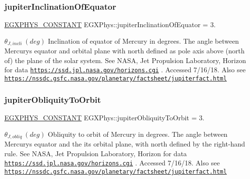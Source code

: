 \subsubsection{\texorpdfstring{jupiter\+Inclination\+Of\+Equator}{jupiterInclinationOfEquator}}
{\footnotesize\ttfamily \mbox{\hyperlink{group___e_g_x_phys-_constants-_macros_ga76980d288494ce1714c9ac68a95ba702}{E\+G\+X\+P\+H\+Y\+S\+\_\+\+C\+O\+N\+S\+T\+A\+NT}} E\+G\+X\+Phys\+::jupiter\+Inclination\+Of\+Equator = 3.}

$ \theta_{J,incli} \ (deg)$ Inclination of equator of Mercury in degrees. The angle between Mercury\textquotesingle{}s equator and orbital plane with north defined as pole axis above (north of) the plane of the solar system. See N\+A\+SA, Jet Propulsion Laboratory, Horizon for data \href{https://ssd.jpl.nasa.gov/horizons.cgi}{\tt https\+://ssd.\+jpl.\+nasa.\+gov/horizons.\+cgi} . Accessed 7/16/18. Also see \href{https://nssdc.gsfc.nasa.gov/planetary/factsheet/jupiterfact.html}{\tt https\+://nssdc.\+gsfc.\+nasa.\+gov/planetary/factsheet/jupiterfact.\+html} \mbox{\label{group___e_g_x_phys-_constants-_astrophysics-_solar_system-_mercury-_orbit_ga80cd2231e9fa0fb10ecf5ea62fdc0ddb}} 
\subsubsection{\texorpdfstring{jupiter\+Obliquity\+To\+Orbit}{jupiterObliquityToOrbit}}
{\footnotesize\ttfamily \mbox{\hyperlink{group___e_g_x_phys-_constants-_macros_ga76980d288494ce1714c9ac68a95ba702}{E\+G\+X\+P\+H\+Y\+S\+\_\+\+C\+O\+N\+S\+T\+A\+NT}} E\+G\+X\+Phys\+::jupiter\+Obliquity\+To\+Orbit = 3.}

$ \theta_{J,obliq} \ (deg)$ Obliquity to orbit of Mercury in degrees. The angle between Mercury\textquotesingle{}s equator and the it\textquotesingle{}s orbital plane, with north defined by the right-\/hand rule. See N\+A\+SA, Jet Propulsion Laboratory, Horizon for data \href{https://ssd.jpl.nasa.gov/horizons.cgi}{\tt https\+://ssd.\+jpl.\+nasa.\+gov/horizons.\+cgi} . Accessed 7/16/18. Also see \href{https://nssdc.gsfc.nasa.gov/planetary/factsheet/jupiterfact.html}{\tt https\+://nssdc.\+gsfc.\+nasa.\+gov/planetary/factsheet/jupiterfact.\+html} \mbox{\label{group___e_g_x_phys-_constants-_astrophysics-_solar_system-_mercury-_orbit_gac92e819ec6b74b0db751948b503ae776}} 
